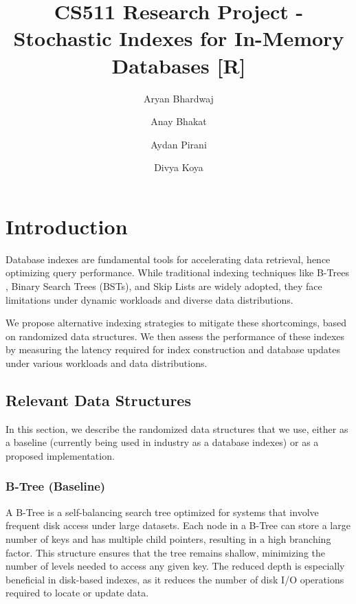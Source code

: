 \documentclass[sigconf]{acmart}
\begin{document}
\title{CS511 Research Project - Stochastic Indexes for In-Memory Databases [R]}

\author{Aryan Bhardwaj}
\author{Anay Bhakat}
\author{Aydan Pirani}
\author{Divya Koya}

\maketitle

\section{Introduction}
Database indexes are fundamental tools for accelerating data retrieval, hence optimizing query performance. While traditional indexing techniques like B-Trees \cite{gao_2024_revisiting}, Binary Search Trees (BSTs), and Skip Lists \cite{redis} are widely adopted, they face limitations under dynamic workloads and diverse data distributions.

We propose alternative indexing strategies to mitigate these shortcomings, based on randomized data structures. We then assess the performance of these indexes by measuring the latency required for index construction and database updates under various workloads and data distributions.

\subsection{Relevant Data Structures}
In this section, we describe the randomized data structures that we use, either as a baseline (currently being used in industry as a database indexes) or as a proposed implementation.

\subsubsection{B-Tree (Baseline)}
A B-Tree\cite{btree_ds} is a self-balancing search tree optimized for systems that involve frequent disk access under large datasets. Each node in a B-Tree can store a large number of keys and has multiple child pointers, resulting in a high branching factor. This structure ensures that the tree remains shallow, minimizing the number of levels needed to access any given key. The reduced depth is especially beneficial in disk-based indexes, as it reduces the number of disk I/O operations required to locate or update data.
\end{document}
